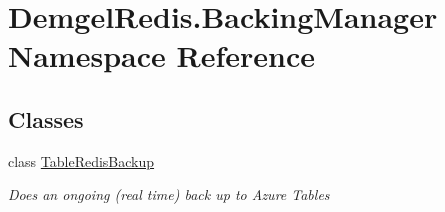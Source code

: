 \hypertarget{namespace_demgel_redis_1_1_backing_manager}{}\section{Demgel\+Redis.\+Backing\+Manager Namespace Reference}
\label{namespace_demgel_redis_1_1_backing_manager}
\subsection*{Classes}
\begin{DoxyCompactItemize}
\item 
class \hyperlink{class_demgel_redis_1_1_backing_manager_1_1_table_redis_backup}{Table\+Redis\+Backup}
\begin{DoxyCompactList}\small\item\em Does an ongoing (real time) back up to Azure Tables \end{DoxyCompactList}\end{DoxyCompactItemize}

